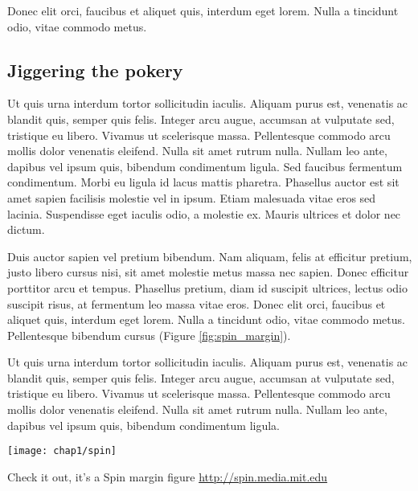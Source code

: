 Donec elit orci, faucibus et aliquet quis, interdum eget lorem. Nulla a tincidunt odio, vitae commodo metus.

\subsection{Jiggering the pokery}

 Ut quis urna interdum tortor sollicitudin iaculis. Aliquam purus est, venenatis ac blandit quis, semper quis felis. Integer arcu augue, accumsan at vulputate sed, tristique eu libero. Vivamus ut scelerisque massa. Pellentesque commodo arcu mollis dolor venenatis eleifend. Nulla sit amet rutrum nulla. Nullam leo ante, dapibus vel ipsum quis, bibendum condimentum ligula. Sed faucibus fermentum condimentum. Morbi eu ligula id lacus mattis pharetra. Phasellus auctor est sit amet sapien facilisis molestie vel in ipsum. Etiam malesuada vitae eros sed lacinia. Suspendisse eget iaculis odio, a molestie ex. Mauris ultrices et dolor nec dictum.\autocite{Rolph2015,Couderc2015}

Duis auctor sapien vel pretium bibendum. Nam aliquam, felis at efficitur pretium, justo libero cursus nisi, sit amet molestie metus massa nec sapien. Donec efficitur porttitor arcu et tempus. Phasellus pretium, diam id suscipit ultrices, lectus odio suscipit risus, at fermentum leo massa vitae eros. Donec elit orci, faucibus et aliquet quis, interdum eget lorem. Nulla a tincidunt odio, vitae commodo metus. Pellentesque bibendum cursus (Figure \ref{fig:spin_margin}).

Ut quis urna interdum tortor sollicitudin iaculis. Aliquam purus est, venenatis ac blandit quis, semper quis felis. Integer arcu augue, accumsan at vulputate sed, tristique eu libero. Vivamus ut scelerisque massa. Pellentesque commodo arcu mollis dolor venenatis eleifend. Nulla sit amet rutrum nulla. Nullam leo ante, dapibus vel ipsum quis, bibendum condimentum ligula.

\begin{marginfigure}
 	\texttt{[image: chap1/spin]}  
  \singlespacing             
 	 \caption{Check it out, it's a Spin margin figure \url{http://spin.media.mit.edu}}
  	\label{fig:spin_margin}
\end{marginfigure}
